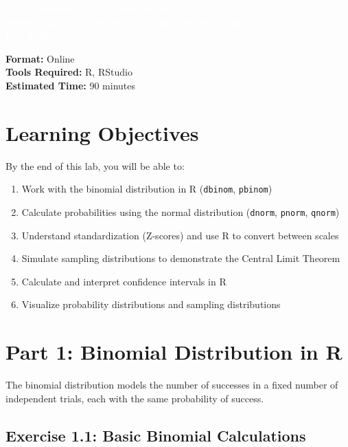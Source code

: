 \documentclass[11pt]{article}
\title{}
\author{}
\date{}
\begin{document}
\begin{tcolorbox}[colback=osaorange,colframe=black,boxrule=2pt,arc=0pt,left=3pt,right=3pt,top=6pt,bottom=6pt,boxsep=2pt]
\centering
\textcolor{white}{\textbf{\Large H524 Introduction to Biostatistics}}\\
\textcolor{white}{\textbf{\Large Week 3 Lab: Probability Distributions and Sampling}}\\
\textcolor{white}{\textbf{\Large Fall 2025}}
\end{tcolorbox}

\vspace{8pt}

\noindent\textbf{Format:} Online\\
\textbf{Tools Required:} R, RStudio\\
\textbf{Estimated Time:} 90 minutes

\section{Learning Objectives}

By the end of this lab, you will be able to:
\begin{enumerate}
\item Work with the binomial distribution in R (\texttt{dbinom}, \texttt{pbinom})
\item Calculate probabilities using the normal distribution (\texttt{dnorm}, \texttt{pnorm}, \texttt{qnorm})
\item Understand standardization (Z-scores) and use R to convert between scales
\item Simulate sampling distributions to demonstrate the Central Limit Theorem
\item Calculate and interpret confidence intervals in R
\item Visualize probability distributions and sampling distributions
\end{enumerate}

\section{Part 1: Binomial Distribution in R}

The binomial distribution models the number of successes in a fixed number of independent trials, each with the same probability of success.

\subsection{Exercise 1.1: Basic Binomial Calculations}
\end{document}
